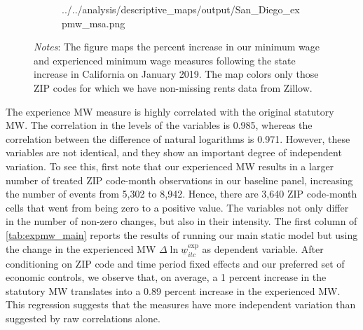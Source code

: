 \begin{figure}
\begin{subfigure}[b]{0.65\textwidth}
			{../../analysis/descriptive_maps/output/San_Diego_expmw_msa.png}
	\end{subfigure}
	\begin{minipage}{0.95\textwidth} \footnotesize
		\vspace{2mm} 
		\textit{Notes}: The figure maps the percent increase in our minimum wage and 
		experienced minimum wage measures following the state increase in California
		on January 2019. The map colors only those ZIP codes for which we have 
		non-missing rents data from Zillow.
	\end{minipage}
\end{figure}

The experience MW measure is highly correlated with the original statutory MW. The 
correlation in the levels of the variables is 0.985, whereas the correlation between the 
difference of natural logarithms is 0.971. %
However, these variables are not identical, and they show an important degree of independent 
variation. To see this, first note that our experienced MW results in a larger number of 
treated ZIP code-month observations in our baseline panel, increasing the number of events 
from 5,302 to 8,942. %
Hence, there are 3,640 ZIP code-month cells that went from being zero to a positive value. 
The variables not only differ in the number of non-zero changes, but also in their intensity. 
The first column of \autoref{tab:expmw_main} reports the results of running our main static 
model but using the change in the experienced MW $\Delta \ln \underline{w}_{itc}^{\text{exp}}$ 
as dependent variable. After conditioning on ZIP code and time period fixed effects
and our preferred set of economic controls, we observe that, on average, a 1 percent increase 
in the statutory MW translates into a 0.89 percent increase in the experienced MW. This 
regression suggests that the measures have more independent variation than suggested by 
raw correlations alone.

